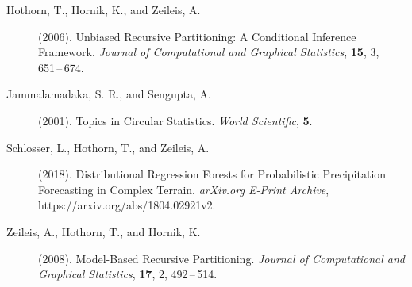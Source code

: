 \documentclass[twoside]{report}
\begin{document}
\begin{description}


\item[Hothorn, T., Hornik, K., and Zeileis, A.] (2006).
     Unbiased Recursive Partitioning: A Conditional Inference Framework.
     {\it Journal of Computational and Graphical Statistics}, {\bf 15}, 3,
     651\,--\,674. 

\item[Jammalamadaka, S. R., and Sengupta, A.] (2001).
     Topics in Circular Statistics.
     {\it World Scientific}, {\bf 5}. 



\item[Schlosser, L., Hothorn, T., and Zeileis, A.] (2018).
     Distributional Regression Forests for Probabilistic Precipitation Forecasting in Complex Terrain.
     {\it arXiv.org E-Print Archive}, https://arxiv.org/abs/1804.02921v2.

\item[Zeileis, A., Hothorn, T., and Hornik, K.] (2008).
     Model-Based Recursive Partitioning.
     {\it Journal of Computational and Graphical Statistics}, {\bf 17}, 2,
     492\,--\,514. 
     

\end{description}
\end{document}
